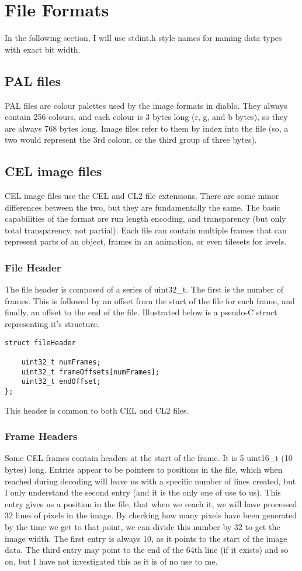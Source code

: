\chapter{File Formats}
In the following section, I will use stdint.h style names for naming data types with exact bit width.

\section{PAL files}
    PAL files are colour palettes used by the image formats in diablo. They always contain 256 colours, and each colour is 3 bytes long (r, g, and b bytes), so they are always 768 bytes long. Image files refer to them by index into the file (so, a two would represent the 3rd colour, or the third group of three bytes).

\section{CEL image files}
	CEL image files use the CEL and CL2 file extensions. There are some minor differences between the two, but they are fundamentally the same. The basic capabilities of the format are run length encoding, and transparency (but only total transparency, not partial). Each file can contain multiple frames that can represent parts of an object, frames in an animation, or even tilesets for levels.

	\subsection{File Header}
	\label{sec:fileheaders}
	The file header is composed of a series of uint32\_t. The first is the number of frames. This is followed by an offset from the start of the file for each frame, and finally, an offset to the end of the file. Illustrated below is a pseudo-C struct representing it's structure.
	\begin{lstlisting}
struct fileHeader

	uint32_t numFrames;
	uint32_t frameOffsets[numFrames];
	uint32_t endOffset;
};
	\end{lstlisting}
	 This header is common to both CEL and CL2 files.
	 
	\subsection{Frame Headers}
	\label{sec:frameheaders}
	Some CEL frames contain headers at the start of the frame. It is 5 uint16\_t (10 bytes) long. Entries appear to be pointers to positions in the file, which when reached during decoding will leave us with a specific number of lines created, but I only understand the second entry (and it is the only one of use to us). This entry gives us a position in the file, that when we reach it, we will have processed 32 lines of pixels in the image. By checking how many pixels have been generated by the time we get to that point, we can divide this number by 32 to get the image width.
	The first entry is always 10, as it points to the start of the image data.
	The third entry may point to the end of the 64th line (if it exists) and so on, but I have not investigated this as it is of no use to me.
	
